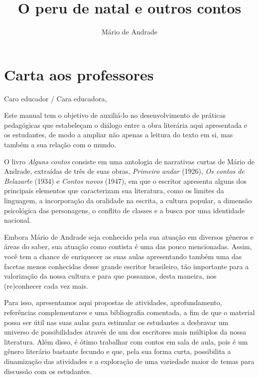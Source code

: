 \documentclass[12pt]{extarticle}
\begin{document}
\newcommand{\AutorLivro}{Mário de Andrade}
\newcommand{\TituloLivro}{O peru de natal e outros contos}
\newcommand{\Tema}{Ficção, mistério e fantasia}
\newcommand{\Genero}{Conto, crônica e novela}
\newcommand{\issnppub}{---}
\newcommand{\issnepub}{---}
\newcommand{\colaborador}{\textbf{Rodrigo Jorge Ribeiro Neves} é uma pessoa incrível e vai fazer um bom serviço.}


\title{\TituloLivro}
\author{\AutorLivro}
\def\authornotes{\colaborador}

\date{}
\maketitle
\tableofcontents

\pagebreak

\section{Carta aos professores}

Caro educador / Cara educadora,\\\bigskip

Este manual tem o objetivo de auxiliá-lo no desenvolvimento de práticas
pedagógicas que estabeleçam o diálogo entre a obra literária aqui
apresentada e os estudantes, de modo a ampliar não apenas a leitura do
texto em si, mas também a sua relação com o mundo.

O livro \emph{Alguns} \emph{contos} consiste em uma antologia de
narrativas curtas de Mário de Andrade, extraídas de três de suas obras,
\emph{Primeiro andar} (1926), \emph{Os contos de Belazarte} (1934) e
\emph{Contos novos} (1947), em que o escritor apresenta alguns dos
principais elementos que caracterizam sua literatura, como os limites da
linguagem, a incorporação da oralidade na escrita, a cultura popular, a
dimensão psicológica das personagens, o conflito de classes e a busca
por uma identidade nacional.

Embora Mário de Andrade seja conhecido pela sua atuação em diversos
gêneros e áreas do saber, sua atuação como contista é uma das pouco
mencionadas. Assim, você tem a chance de enriquecer as suas aulas
apresentando também uma das facetas menos conhecidas desse grande
escritor brasileiro, tão importante para a valorização da nossa cultura
e para que possamos, desta maneira, nos (re)conhecer cada vez mais.

Para isso, apresentamos aqui propostas de atividades, aprofundamento,
referências complementares e uma bibliografia comentada, a fim de que o
material possa ser útil nas suas aulas para estimular os estudantes a
desbravar um universo de possibilidades através de um dos escritores
mais múltiplos da nossa literatura. Além disso, é ótimo trabalhar com
contos em sala de aula, pois é um gênero literário bastante fecundo e
que, pela sua forma curta, possibilita a dinamização das atividades e a
exploração de uma variedade maior de temas para discussão com os
estudantes.
\end{document}
